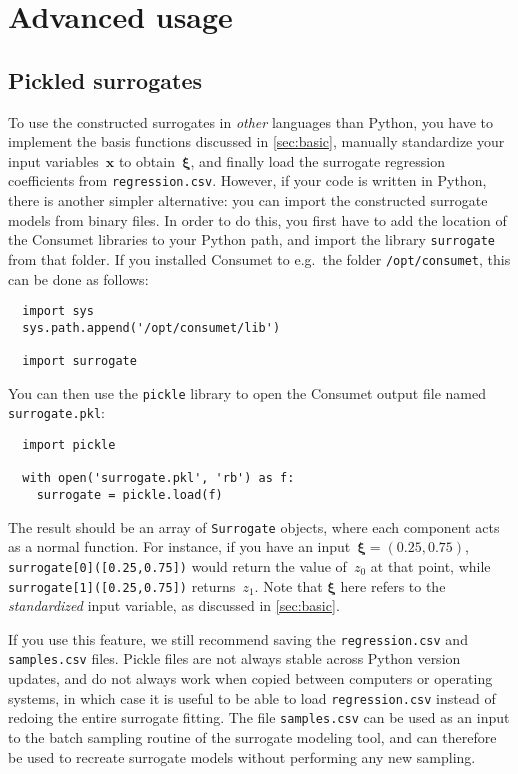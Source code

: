 \documentclass[a4paper,bibliography=numbered]{scrartcl}
\begin{document}
\newpage
\section{Advanced usage}
\subsection{Pickled surrogates}
To use the constructed surrogates in \emph{other} languages than Python, you have to implement the basis functions discussed in \cref{sec:basic}, manually standardize your input variables~$\bm{x}$ to obtain~$\bm{\xi}$, and finally load the surrogate regression coefficients from \texttt{regression.csv}.
However, if your code is written in Python, there is another simpler alternative: you can import the constructed surrogate models from binary files.
In order to do this, you first have to add the location of the Consumet libraries to your Python path, and import the library \texttt{surrogate} from that folder.
If you installed Consumet to e.g.\ the folder \verb|/opt/consumet|, this can be done as follows:
\begin{lstlisting}
  import sys
  sys.path.append('/opt/consumet/lib')

  import surrogate
\end{lstlisting}
You can then use the \texttt{pickle} library to open the Consumet output file named \texttt{surrogate.pkl}:
\begin{lstlisting}
  import pickle

  with open('surrogate.pkl', 'rb') as f:
    surrogate = pickle.load(f)
\end{lstlisting}
The result should be an array of \texttt{Surrogate} objects, where each component acts as a normal function.
For instance, if you have an input~$\bm{\xi} = (0.25,0.75)$, \texttt{surrogate[0]([0.25,0.75])} would return the value of~$z_0$ at that point, while \texttt{surrogate[1]([0.25,0.75])} returns~$z_1$.
Note that $\bm{\xi}$ here refers to the \emph{standardized} input variable, as discussed in \cref{sec:basic}.

If you use this feature, we still recommend saving the \texttt{regression.csv} and \texttt{samples.csv} files.
Pickle files are not always stable across Python version updates, and do not always work when copied between computers or operating systems, in which case it is useful to be able to load \texttt{regression.csv} instead of redoing the entire surrogate fitting.
The file \texttt{samples.csv} can be used as an input to the batch sampling routine of the surrogate modeling tool, and can therefore be used to recreate surrogate models without performing any new sampling.
\end{document}
